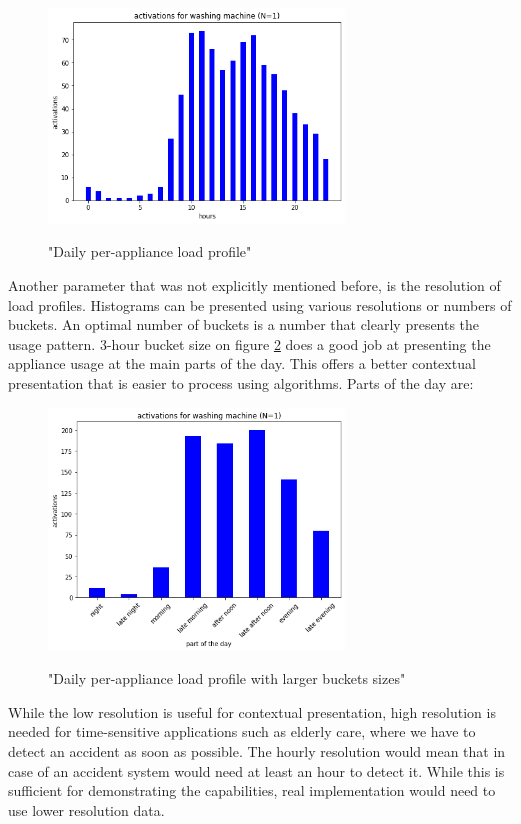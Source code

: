 \begin{figure}[H]
	\centering
	\caption{"Daily per-appliance load profile"}
	\includegraphics[width=0.7\textwidth]{../Figures/LPS/WM_daily.png}
	\label{fig:WM_daily}
\end{figure}

Another parameter that was not explicitly mentioned before, is the resolution of load profiles. 
Histograms can be presented using various resolutions or numbers of buckets.
An optimal number of buckets is a number that clearly presents the usage pattern. 
3-hour bucket size on figure \ref{fig:4hours} does a good job at presenting the appliance usage at the main parts of the day.
This offers a better contextual presentation that is easier to process using algorithms.
Parts of the day are:

\begin{figure}[H]
	\centering
	\caption{"Daily per-appliance load profile with larger buckets sizes"}
	\includegraphics[width=0.7\textwidth]{../Figures/LPS/3 hours.png}
	\label{fig:4hours}
\end{figure}


While the low resolution is useful for contextual presentation,
high resolution is needed for time-sensitive applications such as elderly care,
where we have to detect an accident as soon as possible.
The hourly resolution would mean that in case of an accident system would need at least an hour to detect it.
While this is sufficient for demonstrating the capabilities, real implementation would need to use lower resolution data.

